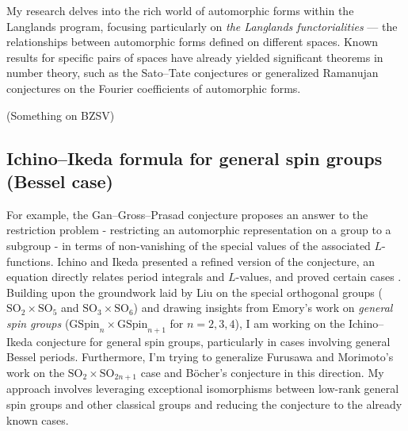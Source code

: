 \documentclass[12pt]{article}
\begin{document}
My research delves into the rich world of automorphic forms within the Langlands program, focusing particularly on \emph{the Langlands functorialities} — the relationships between automorphic forms defined on different spaces.
Known results for specific pairs of spaces have already yielded significant theorems in number theory, such as the Sato--Tate conjectures \cite{harris2010family,barnet2011family} or generalized Ramanujan conjectures \cite{sarnak2005notes} on the Fourier coefficients of automorphic forms.

(Something on BZSV)

\subsection*{Ichino--Ikeda formula for general spin groups (Bessel case)}


For example, the Gan--Gross--Prasad conjecture \cite{gan2011symplectic} proposes an answer to the restriction problem - restricting an automorphic representation on a group to a subgroup - in terms of non-vanishing of the special values of the  associated $L$-functions. 
Ichino and Ikeda presented a refined version of the conjecture, an equation directly relates period integrals and $L$-values, and proved certain cases \cite{ichino2010periods}. 
Building upon the groundwork laid by Liu \cite{liu2016refined} on the special orthogonal groups ($\mathrm{SO}_{2} \times \mathrm{SO}_{5}$ and $\mathrm{SO}_{3} \times \mathrm{SO}_{6}$) and drawing insights from Emory's work \cite{emory2020global} on \emph{general spin groups} ($\mathrm{GSpin}_{n} \times \mathrm{GSpin}_{n+1}$ for $n = 2, 3, 4$), I am working on the Ichino--Ikeda conjecture for general spin groups, particularly in cases involving general Bessel periods.
Furthermore, I'm trying to generalize Furusawa and Morimoto's work on the $\mathrm{SO}_{2} \times \mathrm{SO}_{2n+1}$ case and B\"ocher's conjecture \cite{furusawa2020refined} in this direction.
My approach involves leveraging exceptional isomorphisms between low-rank general spin groups and other classical groups and reducing the conjecture to the already known cases.
\end{document}
